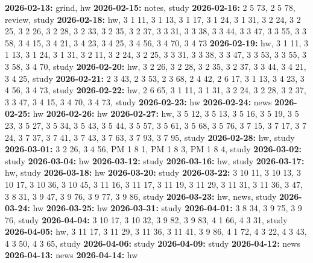 {\noindent \bf 2026-02-13:} grind, hw\smallskip
{\noindent \bf 2026-02-15:} notes, study\smallskip
{\noindent \bf 2026-02-16:} 2 5 73, 2 5 78, review, study\smallskip
{\noindent \bf 2026-02-18:} hw, 3 1 11, 3 1 13, 3 1 17, 3 1 24, 3 1 31, 3 2 24, 3 2 25, 3 2 26, 3 2 28, 3 2 33, 3 2 35, 3 2 37, 3 3 31, 3 3 38, 3 3 44, 3 3 47, 3 3 55, 3 3 58, 3 4 15, 3 4 21, 3 4 23, 3 4 25, 3 4 56, 3 4 70, 3 4 73\smallskip
{\noindent \bf 2026-02-19:} hw, 3 1 11, 3 1 13, 3 1 24, 3 1 31, 3 2 11, 3 2 24, 3 2 25, 3 3 31, 3 3 38, 3 3 47, 3 3 53, 3 3 55, 3 3 58, 3 4 70, study\smallskip
{\noindent \bf 2026-02-20:} hw, 3 2 26, 3 2 28, 3 2 35, 3 2 37, 3 3 44, 3 4 21, 3 4 25, study\smallskip
{\noindent \bf 2026-02-21:} 2 3 43, 2 3 53, 2 3 68, 2 4 42, 2 6 17, 3 1 13, 3 4 23, 3 4 56, 3 4 73, study\smallskip
{\noindent \bf 2026-02-22:} hw, 2 6 65, 3 1 11, 3 1 31, 3 2 24, 3 2 28, 3 2 37, 3 3 47, 3 4 15, 3 4 70, 3 4 73, study\smallskip
{\noindent \bf 2026-02-23:} hw\smallskip
{\noindent \bf 2026-02-24:} news\smallskip
{\noindent \bf 2026-02-25:} hw\smallskip
{\noindent \bf 2026-02-26:} hw\smallskip
{\noindent \bf 2026-02-27:} hw, 3 5 12, 3 5 13, 3 5 16, 3 5 19, 3 5 23, 3 5 27, 3 5 34, 3 5 43, 3 5 44, 3 5 57, 3 5 61, 3 5 68, 3 5 76, 3 7 15, 3 7 17, 3 7 24, 3 7 37, 3 7 41, 3 7 43, 3 7 63, 3 7 93, 3 7 95, study\smallskip
{\noindent \bf 2026-02-28:} hw, study\smallskip
{\noindent \bf 2026-03-01:} 3 2 26, 3 4 56, PM 1 8 1, PM 1 8 3, PM 1 8 4, study\smallskip
{\noindent \bf 2026-03-02:} study\smallskip
{\noindent \bf 2026-03-04:} hw\smallskip
{\noindent \bf 2026-03-12:} study\smallskip
{\noindent \bf 2026-03-16:} hw, study\smallskip
{\noindent \bf 2026-03-17:} hw, study\smallskip
{\noindent \bf 2026-03-18:} hw\smallskip
{\noindent \bf 2026-03-20:} study\smallskip
{\noindent \bf 2026-03-22:} 3 10 11, 3 10 13, 3 10 17, 3 10 36, 3 10 45, 3 11 16, 3 11 17, 3 11 19, 3 11 29, 3 11 31, 3 11 36, 3 47, 3 8 31, 3 9 47, 3 9 76, 3 9 77, 3 9 86, study\smallskip
{\noindent \bf 2026-03-23:} hw, news, study\smallskip
{\noindent \bf 2026-03-24:} hw\smallskip
{\noindent \bf 2026-03-25:} hw\smallskip
{\noindent \bf 2026-03-31:} study\smallskip
{\noindent \bf 2026-04-01:} 3 8 34, 3 9 75, 3 9 76, study\smallskip
{\noindent \bf 2026-04-04:} 3 10 17, 3 10 32, 3 9 82, 3 9 83, 4 1 66, 4 3 31, study\smallskip
{\noindent \bf 2026-04-05:} hw, 3 11 17, 3 11 29, 3 11 36, 3 11 41, 3 9 86, 4 1 72, 4 3 22, 4 3 43, 4 3 50, 4 3 65, study\smallskip
{\noindent \bf 2026-04-06:} study\smallskip
{\noindent \bf 2026-04-09:} study\smallskip
{\noindent \bf 2026-04-12:} news\smallskip
{\noindent \bf 2026-04-13:} news\smallskip
{\noindent \bf 2026-04-14:} hw\smallskip
